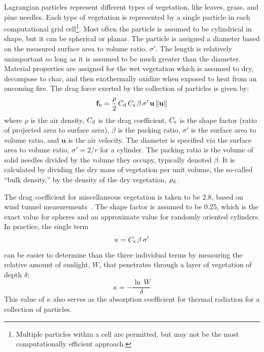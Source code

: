 \documentclass[journal,article,atmosphere,submit,moreauthors,pdftex]{Definitions/mdpi}
\begin{document}
Lagrangian particles represent different types of vegetation, like leaves, grass, and pine needles. Each type of vegetation is represented by a single particle in each computational grid cell\footnote{Multiple particles within a cell are permitted, but may not be the most computationally efficient approach.}. Most often the particle is assumed to be cylindrical in shape, but it can be spherical or planar. The particle is assigned a diameter based on the measured surface area to volume ratio, $\sigma'$. The length is relatively unimportant so long as it is assumed to be much greater than the diameter. Material properties are assigned for the wet vegetation which is assumed to dry, decompose to char, and then exothermally oxidize when exposed to heat from an oncoming fire. The drag force exerted by the collection of particles is given by:
\begin{equation}
   \mathbf{f}_{\rm b} = \frac{\rho}{2} \, C_{\rm d} \, C_{\rm s} \, \beta \, \sigma' \, \mathbf{u} \, \|\mathbf{u}\|
   \label{drag}
\end{equation}
where $\rho$ is the air density, $C_{\rm d}$ is the drag coefficient, $C_{\rm s}$ is the shape factor (ratio of projected area to surface area), $\beta$ is the packing ratio, $\sigma'$ is the surface area to volume ratio, and $\mathbf{u}$ is the air velocity. The diameter is specified via the surface area to volume ratio, $\sigma'=2/r$ for a cylinder. The packing ratio is the volume of solid needles divided by the volume they occupy, typically denoted $\beta$. It is calculated by dividing the dry mass of vegetation per unit volume, the so-called ``bulk density,'' by the density of the dry vegetation, $\rho_{\rm d}$.

The drag coefficient for miscellaneous vegetation is taken to be 2.8, based on wind tunnel measurements~\cite{Falkenstein-Smith:2018}. The shape factor is assumed to be 0.25, which is the exact value for spheres and an approximate value for randomly oriented cylinders. In practice, the single term
\begin{equation}
   \kappa = C_{\rm s}  \, \beta \, \sigma'
\end{equation}
can be easier to determine than the three individual terms by measuring the relative amount of sunlight, $W$, that penetrates through a layer of vegetation of depth $\delta$:
\begin{equation}
   \kappa = -\frac{\ln \, W}{\delta}
\end{equation}
This value of $\kappa$ also serves as the absorption coefficient for thermal radiation for a collection of particles.
\end{document}
